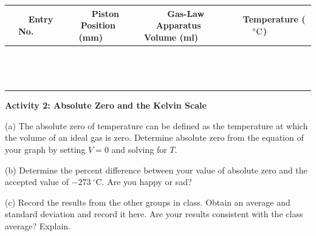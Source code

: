 \vspace{0.3cm}
{\centering \begin{tabular}{|c|c|c|c|}
\hline 
~~~Entry No.~~~&
~~~Piston Position (mm)~~~&
~~~Gas-Law Apparatus Volume (ml)~~~&
~~~Temperature ($^\circ  \rm C$)~~~\\
\hline
\hline 
&
&
&
\\
\hline 
&
&
&
\\
\hline 
&
&
&
\\
\hline 
&
&
&
\\
\hline 
&
&
&
\\
\hline 
&
&
&
\\
\hline 
&
&
&
\\
\hline 
&
&
&
\\
\hline 
&
&
&
\\
\hline
&
&
&
\\
\hline
&
&
&
\\
\hline
&
&
&
\\
\hline
&
&
&
\\
\hline
&
&
&
\\
\hline
\end{tabular}\par}
\vspace{1.0cm}

\textbf{Activity 2: Absolute Zero and the Kelvin Scale}

(a) The absolute zero of temperature can be defined as the temperature
at which the volume of an ideal gas is zero. Determine absolute
zero from the equation of your graph by setting $V = 0$ and solving for $T$.
\answerspace{30mm}

(b) Determine the percent difference between your value of absolute
zero and the accepted value of $-273~^{\circ }$C. Are you happy or sad?
\answerspace{30mm}

(c) Record the results from the other groups in class.
Obtain an average and standard deviation and record it here.
Are your results consistent with the class average? Explain.
\answerspace{10mm}
